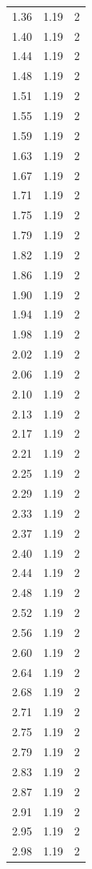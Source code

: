 \begin{longtable}{lrr}
  1.36 & 1.19 & 2 \\
  1.40 & 1.19 & 2 \\
  1.44 & 1.19 & 2 \\
  1.48 & 1.19 & 2 \\
  1.51 & 1.19 & 2 \\
  1.55 & 1.19 & 2 \\
  1.59 & 1.19 & 2 \\
  1.63 & 1.19 & 2 \\
  1.67 & 1.19 & 2 \\
  1.71 & 1.19 & 2 \\
  1.75 & 1.19 & 2 \\
  1.79 & 1.19 & 2 \\
  1.82 & 1.19 & 2 \\
  1.86 & 1.19 & 2 \\
  1.90 & 1.19 & 2 \\
  1.94 & 1.19 & 2 \\
  1.98 & 1.19 & 2 \\
  2.02 & 1.19 & 2 \\
  2.06 & 1.19 & 2 \\
  2.10 & 1.19 & 2 \\
  2.13 & 1.19 & 2 \\
  2.17 & 1.19 & 2 \\
  2.21 & 1.19 & 2 \\
  2.25 & 1.19 & 2 \\
  2.29 & 1.19 & 2 \\
  2.33 & 1.19 & 2 \\
  2.37 & 1.19 & 2 \\
  2.40 & 1.19 & 2 \\
  2.44 & 1.19 & 2 \\
  2.48 & 1.19 & 2 \\
  2.52 & 1.19 & 2 \\
  2.56 & 1.19 & 2 \\
  2.60 & 1.19 & 2 \\
  2.64 & 1.19 & 2 \\
  2.68 & 1.19 & 2 \\
  2.71 & 1.19 & 2 \\
  2.75 & 1.19 & 2 \\
  2.79 & 1.19 & 2 \\
  2.83 & 1.19 & 2 \\
  2.87 & 1.19 & 2 \\
  2.91 & 1.19 & 2 \\
  2.95 & 1.19 & 2 \\
  2.98 & 1.19 & 2 \\

\end{longtable}

